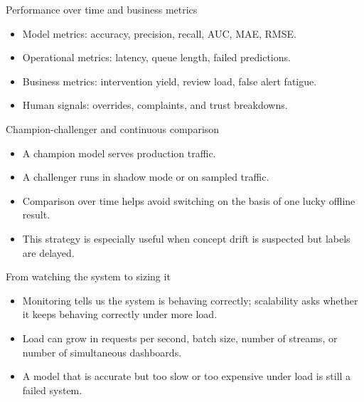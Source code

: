 \begin{frame}{Performance over time and business metrics}
\begin{itemize}
\item Model metrics: accuracy, precision, recall, AUC, MAE, RMSE.
\item Operational metrics: latency, queue length, failed predictions.
\item Business metrics: intervention yield, review load, false alert fatigue.
\item Human signals: overrides, complaints, and trust breakdowns.
\end{itemize}
\coursefooter
\end{frame}

\begin{frame}{Champion-challenger and continuous comparison}
\begin{itemize}
\item A champion model serves production traffic.
\item A challenger runs in shadow mode or on sampled traffic.
\item Comparison over time helps avoid switching on the basis of one lucky offline result.
\item This strategy is especially useful when concept drift is suspected but labels are delayed.
\end{itemize}
\coursefooter
\end{frame}

\begin{frame}{From watching the system to sizing it}
\begin{itemize}
\item Monitoring tells us the system is behaving correctly; scalability asks whether it keeps behaving correctly under more load.
\item Load can grow in requests per second, batch size, number of streams, or number of simultaneous dashboards.
\item A model that is accurate but too slow or too expensive under load is still a failed system.
\end{itemize}
\coursefooter
\end{frame}

